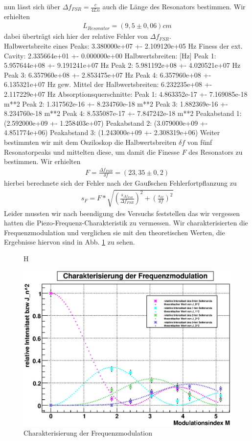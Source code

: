 \documentclass[12pt]{article}
\begin{document}
nun lässt sich über $\Delta f_{FSR} = \frac{c}{4Ln}$ auch die Länge des Resonators bestimmen. Wir erhielten
\begin{align*}
 L_{Resonator}= (9,5 \pm 0,06) cm
\end{align*}
dabei überträgt sich hier der relative Fehler von $\Delta f_{FSR}$.  \\
Halbwertsbreite eines Peaks: 3.380000e+07 +- 2.109120e+05 Hz
Finess der ext. Cavity: 2.335664e+01 +- 0.000000e+00
Halbwertsbreiten: [Hz]
Peak 1: 5.957644e+08 +- 9.191241e+07 Hz
Peak 2: 5.981192e+08 +- 4.020521e+07 Hz
Peak 3: 6.357960e+08 +- 2.853475e+07 Hz
Peak 4: 6.357960e+08 +- 6.135321e+07 Hz
gew. Mittel der Halbwertsbreiten: 6.232235e+08 +- 2.117229e+07 Hz
Absorptionsquerschnitte:
Peak 1: 4.863352e-17 +- 7.169085e-18 m**2
Peak 2: 1.317562e-16 +- 8.234760e-18 m**2
Peak 3: 1.882369e-16 +- 8.234760e-18 m**2
Peak 4: 8.535087e-17 +- 7.847242e-18 m**2
Peakabstand 1: (2.592000e+09 +- 1.258403e+07)
Peakabstand 2: (3.079000e+09 +- 4.851774e+06)
Peakabstand 3: (1.243000e+09 +- 2.308319e+06)
Weiter bestimmten wir mit dem Osziloskop die Halbwertsbreiten $\delta f$ von fünf Resonatorpeaks und mittelten diese, um damit die Finesse $F$ des Resonators zu bestimmen. Wir erhielten 
\begin{align*}
 F = \frac{\Delta f_{FSR}}{\delta f} = ( 23,35 \pm 0,2 )
\end{align*}
hierbei berechnete sich der Fehler nach der Gaußschen Fehlerfortpflanzung zu
\begin{align*}
 s_F = F * \sqrt{ \left( \frac{s_{\Delta f_{FSR}}}{\Delta f_{FSR}} \right)^2 + \left( \frac{s_{\delta f}}{\delta f} \right)^2}
\end{align*}
Leider mussten wir nach beendigung des Versuchs feststellen das wir vergessen hatten die Piezo-Frequenz-Charakteristik zu vermessen. 
Wir charakterisierten die Frequenzmodulation und verglichen sie mit den theoretischen Werten, die Ergebnisse hiervon sind in Abb. \ref{bessel} zu sehen.
\begin{figure}H

 \includegraphics[width=0.9\linewidth]{pictures/modulation.eps}
 \caption{Charakterisierung der Frequenzmodulation}
 \label{bessel}
\end{figure}
\end{document}
